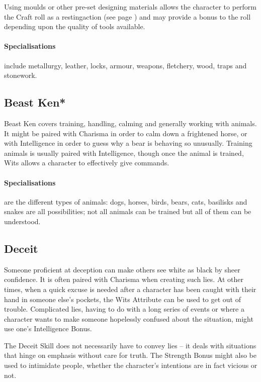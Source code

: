 \begin{multicols}{2}
Using moulds or other pre-set designing materials allows the character to perform the Craft roll as a \gls{restingaction} (see page \pageref{restingactions}) and may provide a bonus to the roll depending upon the quality of tools available.

\paragraph{Specialisations} include metallurgy, leather, locks, armour, weapons, fletchery, wood, traps and stonework.

\subsection{Beast Ken*}

Beast Ken covers training, handling, calming and generally working with animals. It might be paired with Charisma in order to calm down a frightened horse, or with Intelligence in order to guess why a bear is behaving so unusually. Training animals is usually paired with Intelligence, though once the animal is trained, Wits allows a character to effectively give commands.

\paragraph{Specialisations} are the different types of animals: dogs, horses, birds, bears, cats, basilisks and snakes are all possibilities; not all animals can be trained but all of them can be understood.

\subsection{Deceit}

Someone proficient at deception can make others see white as black by sheer confidence. It is often paired with Charisma when creating such lies. At other times, when a quick excuse is needed after a character has been caught with their hand in someone else's pockets, the Wits Attribute can be used to get out of trouble. Complicated lies, having to do with a long series of events or where a character wants to make someone hopelessly confused about the situation, might use one's Intelligence Bonus.

The Deceit Skill does not necessarily have to convey lies -- it deals with situations that hinge on emphasis without care for truth.
The Strength Bonus might also be used to intimidate people, whether the character's intentions are in fact vicious or not.


\end{multicols}
